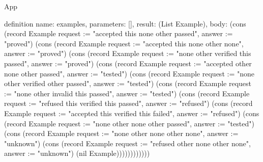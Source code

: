 \begin{lexlean}{App}
\begin{semanticmodule}
definition{
  name: examples,
  parameters: [],
  result: (List Example),
  body: (cons (record Example {request := "accepted this none other passed", answer := "proved"}) (cons (record Example {request := "accepted this none other none", answer := "proved"}) (cons (record Example {request := "none other verified this passed", answer := "proved"}) (cons (record Example {request := "accepted other none other passed", answer := "tested"}) (cons (record Example {request := "none other verified other passed", answer := "tested"}) (cons (record Example {request := "none other invalid this passed", answer := "tested"}) (cons (record Example {request := "refused this verified this passed", answer := "refused"}) (cons (record Example {request := "accepted this verified this failed", answer := "refused"}) (cons (record Example {request := "none other none other passed", answer := "tested"}) (cons (record Example {request := "none other none other none", answer := "unknown"}) (cons (record Example {request := "refused other none other none", answer := "unknown"}) (nil Example))))))))))))
}
\end{semanticmodule}
\end{lexlean}
